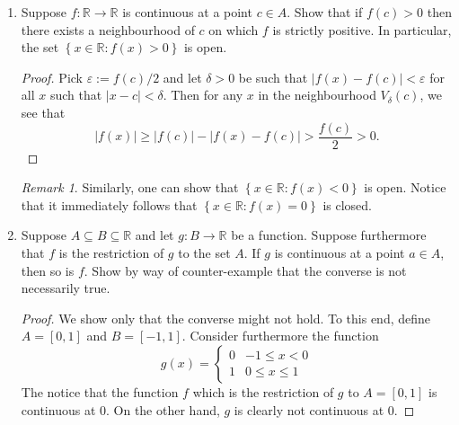 \documentclass[12pt, reqno]{article}
\numberwithin{equation}{section}
\theoremstyle{definition}
\theoremstyle{remark}
\newtheorem{rem}{Remark}
\newcommand{\RR}{\mathbb{R}}
\newcommand{\set}[1]{\left\{#1\right\}}
\newcommand{\abs}[1]{\left\lvert#1\right\rvert}
\renewcommand{\epsilon}{\varepsilon}
\begin{document}
\begin{enumerate}[leftmargin=*]
	      \begin{proof}
		      Fix $\epsilon > 0$ and let ${\delta}$ be such that $\abs{f(x) - f(c)} < \epsilon/2$ for all $x\in A$ such that $\abs{x-c} < {\delta}$. Now, suppose $x,y\in A\cap V_\delta(c)$ and notice that
		      \[
			      \abs{f(x) - f(y)} \leq \abs{f(x) - f(c)} + \abs{f(c) - f(y)} \leq \frac{\epsilon}{2} + \frac{\epsilon}{2} = \epsilon.
		      \]
	      \end{proof}

	\item Suppose $f:\RR\to\RR$ is continuous at a point $c\in A$. Show that if $f(c) > 0$ then there exists a neighbourhood of $c$ on which $f$ is strictly positive. In particular, the set $\set{x \in \RR : f(x) > 0}$ is open.

	      \begin{proof}
		      Pick $\epsilon := {f(c)}/2$ and let $\delta > 0$ be such that $\abs{f(x) - f(c)} < \epsilon$ for all $x$ such that $\abs{x-c} < \delta$. Then for any $x$ in the neighbourhood $V_\delta(c)$, we see that
		      \[
			      \abs{f(x)} \geq \abs{f(c)} - \abs{f(x) - f(c)} > \frac{f(c)}{2} > 0.
		      \]
	      \end{proof}

	      \begin{rem}
		      Similarly, one can show that $\set{x \in \RR :  f(x) < 0}$ is open. Notice that it immediately follows that $\set{x\in \RR : f(x) = 0}$ is closed.
	      \end{rem}

	\item Suppose $A\subseteq B\subseteq \RR$ and let $g:B\to \RR$ be a function. Suppose furthermore that $f$ is the restriction of $g$ to the set $A$. If $g$ is continuous at a point $a\in A$, then so is $f$. Show by way of counter-example that the converse is not necessarily true.

	      \begin{proof}
		      We show only that the converse might not hold. To this end, define $A = [0,1]$ and $B = [-1,1]$. Consider furthermore the function
		      \[
			      g(x) = \begin{cases}
				      0 & -1 \leq x < 0   \\
				      1 & 0 \leq x \leq 1
			      \end{cases}
		      \]
		      The notice that the function $f$ which is the restriction of $g$ to $A=[0,1]$ is continuous at $0$. On the other hand, $g$ is clearly not continuous at $0$.
	      \end{proof}


\end{enumerate}
\end{document}
